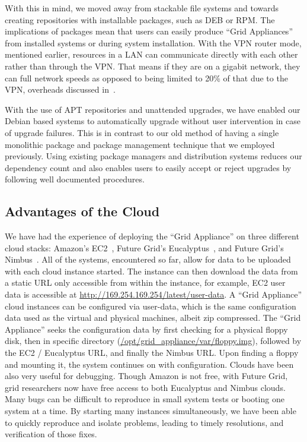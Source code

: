 \documentclass[twocolumn]{svjour3}
\begin{document}
With this in mind, we moved away from stackable file systems and towards
creating repositories with installable packages, such as DEB or RPM.  The
implications of packages mean that users can easily produce ``Grid Appliances''
from installed systems or during system installation.  With the VPN router
mode, mentioned earlier, resources in a LAN can communicate directly with each
other rather than through the VPN.  That means if they are on a gigabit
network, they can full network speeds as opposed to being limited to 20\% of
that due to the VPN, overheads discussed in~\cite{sc09}.

With the use of APT repositories and unattended upgrades, we have enabled our Debian based systems to automatically upgrade without user intervention in case
of upgrade failures.  This is in contrast to our old method of having a single
monolithic package and package management technique that we employed
previously.  Using existing package managers and distribution systems reduces
our dependency count and also enables users to easily accept or reject upgrades
by following well documented procedures.

\subsection{Advantages of the Cloud}

We have had the experience of deploying the ``Grid Appliance'' on three
different cloud stacks:  Amazon's EC2~\cite{ec2}, Future Grid's
Eucalyptus~\cite{eucalyptus}, and Future Grid's Nimbus~\cite{nimbus}.  All of
the systems, encountered so far, allow for data to be uploaded with each cloud
instance started.  The instance can then download the data from a static URL
only accessible from within the instance, for example, EC2 user data is
accessible at \url{http://169.254.169.254/latest/user-data}. A ``Grid
Appliance'' cloud instances can be configured via user-data, which is the same
configuration data used as the virtual and physical machines, albeit zip
compressed.  The ``Grid Appliance'' seeks the configuration data by first
checking for a physical floppy disk, then in specific directory
(\url{/opt/grid_appliance/var/floppy.img}), followed by the EC2 / Eucalyptus
URL, and finally the Nimbus URL.  Upon finding a floppy and mounting it, the
system continues on with configuration.  Clouds have been also very useful for
debugging.  Though Amazon is not free, with Future Grid, grid researchers now
have free access to both Eucalyptus and Nimbus clouds.  Many bugs can be
difficult to reproduce in small system tests or booting one system at a time.
By starting many instances simultaneously, we have been able to quickly
reproduce and isolate problems, leading to timely resolutions, and verification
of those fixes.
\end{document}
